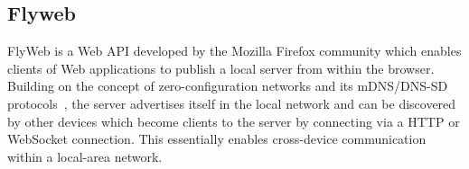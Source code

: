 \subsection{Flyweb}
\label{sec:flyweb}

FlyWeb is a Web API developed by the Mozilla Firefox community which enables clients of Web applications to publish a local server from within the browser. Building on the concept of zero-configuration networks and its mDNS/DNS-SD protocols~\cite{rfc6762, rfc6763}, the server advertises itself in the local network and can be discovered by other devices which become clients to the server by connecting via a HTTP or WebSocket connection. This essentially enables cross-device communication within a local-area network.